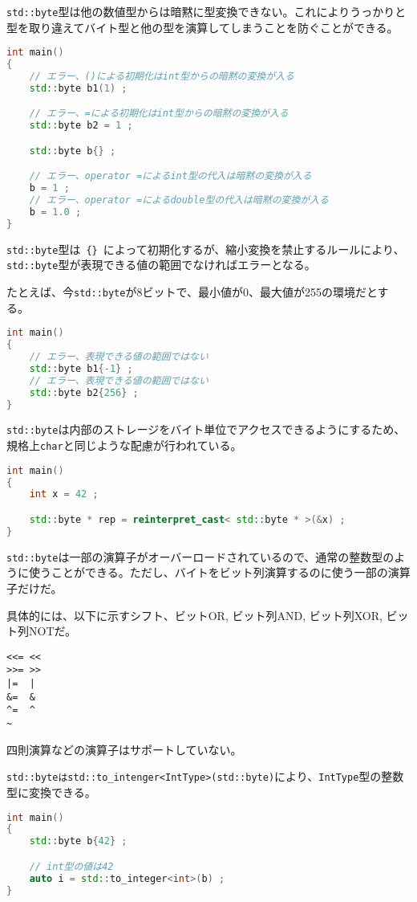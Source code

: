 \lstinline!std::byte!型は他の数値型からは暗黙に型変換できない。これによりうっかりと型を取り違えてバイト型と他の型を演算してしまうことを防ぐことができる。

\begin{lstlisting}[language=C++]
int main()
{
    // エラー、()による初期化はint型からの暗黙の変換が入る
    std::byte b1(1) ;

    // エラー、=による初期化はint型からの暗黙の変換が入る
    std::byte b2 = 1 ;

    std::byte b{} ;

    // エラー、operator =によるint型の代入は暗黙の変換が入る
    b = 1 ;
    // エラー、operator =によるdouble型の代入は暗黙の変換が入る
    b = 1.0 ;
}
\end{lstlisting}

\lstinline!std::byte!型は~\lstinline!{}!~によって初期化するが、縮小変換を禁止するルールにより、\lstinline!std::byte!型が表現できる値の範囲でなければエラーとなる。

たとえば、今\lstinline!std::byte!が8ビットで、最小値が0、最大値が255の環境だとする。

\begin{lstlisting}[language=C++]
int main()
{
    // エラー、表現できる値の範囲ではない
    std::byte b1{-1} ;
    // エラー、表現できる値の範囲ではない
    std::byte b2{256} ;
}
\end{lstlisting}

\lstinline!std::byte!は内部のストレージをバイト単位でアクセスできるようにするため、規格上\lstinline!char!と同じような配慮が行われている。

\begin{lstlisting}[language=C++]
int main()
{
    int x = 42 ;

    std::byte * rep = reinterpret_cast< std::byte * >(&x) ;
}
\end{lstlisting}

\lstinline!std::byte!は一部の演算子がオーバーロードされているので、通常の整数型のように使うことができる。ただし、バイトをビット列演算するのに使う一部の演算子だけだ。

具体的には、以下に示すシフト、ビットOR, ビット列AND, ビット列XOR,
ビット列NOTだ。

\begin{lstlisting}
<<= << 
>>= >>
|=  |
&=  &
^=  ^
~
\end{lstlisting}

四則演算などの演算子はサポートしていない。

\lstinline!std::byteはstd::to_intenger<IntType>(std::byte)!により、\lstinline!IntType!型の整数型に変換できる。

\begin{lstlisting}[language=C++]
int main()
{
    std::byte b{42} ;

    // int型の値は42
    auto i = std::to_integer<int>(b) ;
}
\end{lstlisting}

